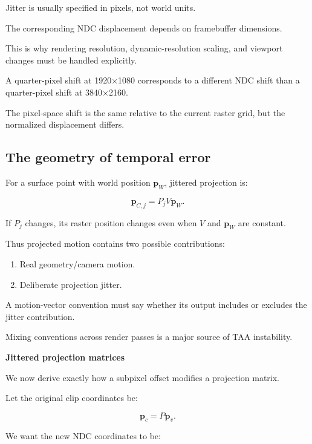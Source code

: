 \hypertarget{02-foundations-ii-ch036-jitter-amplitude}{}

Jitter is usually specified in pixels, not world units.

The corresponding NDC displacement depends on framebuffer dimensions.

This is why rendering resolution, dynamic-resolution scaling, and viewport changes must be handled explicitly.

A quarter-pixel shift at 1920×1080 corresponds to a different NDC shift than a quarter-pixel shift at 3840×2160.

The pixel-space shift is the same relative to the current raster grid, but the normalized displacement differs.

\subsection{The geometry of temporal error}\label{02-foundations-ii-ch036-the-geometry-of-temporal-error}

\hypertarget{02-foundations-ii-ch036-the-geometry-of-temporal-error}{}

For a surface point with world position \(\mathbf p_W\), jittered projection is:

\[
 \mathbf p_{C,j}=P_jV\mathbf p_W.
\]

If \(P_j\) changes, its raster position changes even when \(V\) and \(\mathbf p_W\) are constant.

Thus projected motion contains two possible contributions:

\begin{enumerate}
\def\labelenumi{\arabic{enumi}.}
\tightlist
\item
  Real geometry/camera motion.
\item
  Deliberate projection jitter.
\end{enumerate}

A motion-vector convention must say whether its output includes or excludes the jitter contribution.

Mixing conventions across render passes is a major source of TAA instability.

\textbf{Jittered projection matrices}

We now derive exactly how a subpixel offset modifies a projection matrix.

Let the original clip coordinates be:

\[
 \mathbf p_c=P\mathbf p_v.
\]

We want the new NDC coordinates to be:

